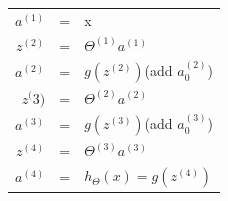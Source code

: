 \documentclass{article}
\begin{document}
\begin{table}[hb]
\begin{center}
\begin{tabular}{rcl}
$a^{(1)}$ &= &x\\
$z^{(2)}$ &= &$\Theta^{(1)}a^{(1)}$\\
$a^{(2)}$ &= &$g(z^{(2)})$(add $a_{0}^{(2)}$)\\
$z^({3)}$ &= &$\Theta^{(2)}a^{(2)}$\\
$a^{(3)}$ &= &$g(z^{(3)})$(add $a_{0}^{(3)}$)\\
$z^{(4)}$ &= &$\Theta^{(3)}a^{(3)}$\\
$a^{(4)}$ &= &$h_{\Theta}(x)=g(z^{(4)})$\\
\end{tabular}
\end{center}
\end{table}
\end{document}
